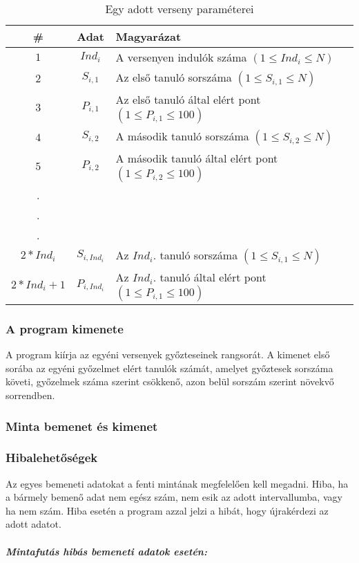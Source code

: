 \documentclass[a4paper]{article}
\begin{document}
        \begin{table}[H]
          \centering
          \caption{Egy adott verseny paraméterei}
          \label{tab:table2}
          \begin{tabular}{ccl}
            \toprule
            \# & Adat & Magyarázat \\
            \midrule
            $1$ & $Ind_i$ & A versenyen indulók száma $(1 \leqslant Ind_i \leqslant N)$ \\
            $2$ & $S_{i,1}$ & Az első tanuló sorszáma $(1 \leqslant S_{i,1} \leqslant N)$ \\
            $3$ & $P_{i,1}$ & Az első tanuló által elért pont $(1 \leqslant P_{i,1} \leqslant 100)$ \\
            $4$ & $S_{i,2}$ & A második tanuló sorszáma $(1 \leqslant S_{i,2} \leqslant N)$ \\
            $5$ & $P_{i,2}$ & A második tanuló által elért pont $(1 \leqslant P_{i,2} \leqslant 100)$ \\
            . \\
            . \\
            . \\
            $2*Ind_i$ & $S_{i,Ind_i}$ & Az $Ind_i$. tanuló sorszáma $(1 \leqslant S_{i,1} \leqslant N)$ \\
            $2*Ind_i+1$ & $P_{i,Ind_i}$ & Az $Ind_i$. tanuló által elért pont $(1 \leqslant P_{i,1} \leqslant 100)$ \\
            \bottomrule
          \end{tabular}
        \end{table}
      \subsubsection{A program kimenete}
        A program kiírja az egyéni versenyek győzteseinek rangsorát.
        A kimenet első sorába az egyéni győzelmet elért tanulók számát,
        amelyet győztesek sorszáma követi, győzelmek száma szerint csökkenő,
        azon belül sorszám szerint növekvő sorrendben.
      \subsubsection{Minta bemenet és kimenet}
      \subsubsection{Hibalehetőségek}
        Az egyes bemeneti adatokat a fenti mintának megfelelően kell megadni.
        Hiba, ha a bármely bemenő adat nem egész szám, nem esik az adott intervallumba,
        vagy ha nem szám.
        Hiba esetén a program azzal jelzi a hibát, hogy újrakérdezi az adott adatot.
        \\
        \subparagraph{Mintafutás hibás bemeneti adatok esetén:}
\end{document}
